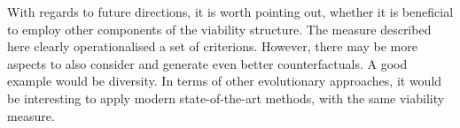 \documentclass[./../../paper.tex]{subfiles}
\begin{document}
With regards to future directions, it is worth pointing out, whether it is beneficial to employ other components of the viability structure. The measure described here clearly operationalised a set of criterions. However, there may be more aspects to also consider and generate even better counterfactuals. A good example would be diversity. In terms of other evolutionary approaches, it would be interesting to apply modern state-of-the-art methods, with the same viability measure.

\end{document}

